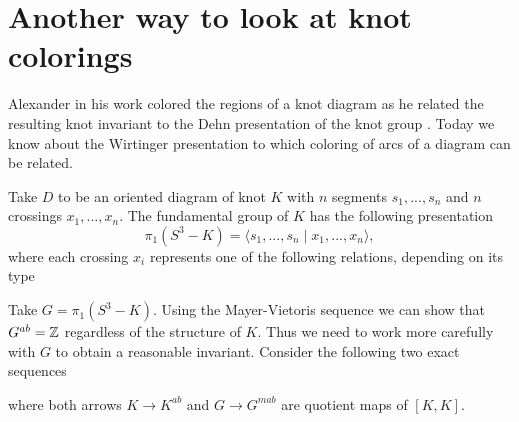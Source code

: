 \section{Another way to look at knot colorings}

Alexander in his work colored the regions of a knot diagram as he related the resulting knot invariant to the Dehn presentation of the knot group \cite{alex-oryginal}. Today we know about the Wirtinger presentation to which coloring of arcs of a diagram can be related.

\begin{definition}
  Take $D$ to be an oriented diagram of knot $K$ with $n$ segments $s_1,..., s_n$ and $n$ crossings $x_1,...,x_n$. The fundamental group of $K$ has the following presentation
  $$\pi_1(S^3-K)=\langle s_1,..., s_n\;|\;x_1,...,x_n\rangle,$$
  where each crossing $x_i$ represents one of the following relations, depending on its type

  \begin{center}
  \end{center}
\end{definition}

Take $G=\pi_1(S^3-K)$. Using the Mayer-Vietoris sequence we can show that $G^{ab}=\operatorname{\mathbb{Z}}$ regardless of the structure of $K$. Thus we need to work more carefully with $G$ to obtain a reasonable invariant. Consider the following two exact sequences
\begin{center}
\end{center}
where both arrows $K\to K^{ab}$ and $G\to G^{mab}$ are quotient maps of $[K, K]$.


